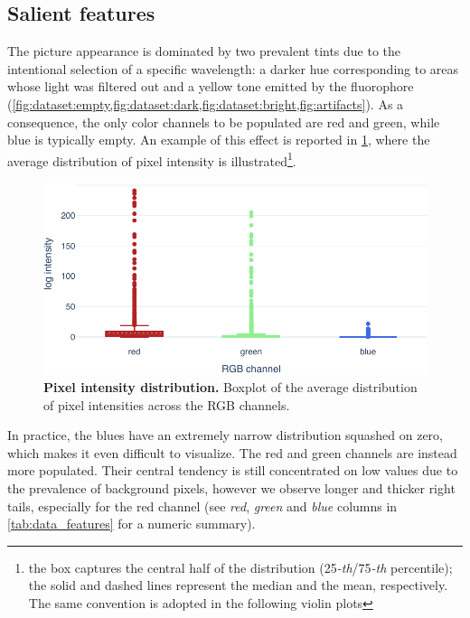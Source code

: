 \subsection{Salient features}
\label{sec:data_features}

The picture appearance is dominated by two prevalent tints due to the intentional selection of a specific wavelength: a darker hue corresponding to areas whose light was filtered out and a yellow tone emitted by the fluorophore
(\cref{fig:dataset:empty,fig:dataset:dark,fig:dataset:bright,fig:artifacts}).
As a consequence, the only color channels to be populated are red and green, while blue is typically empty. 
An example of this effect is reported in \cref{fig:dataset:pixel_intensity}, where the average distribution of pixel intensity is illustrated\footnote{the box captures the central half of the distribution (25\emph{-th}/75\emph{-th} percentile); the solid and dashed lines represent the median and the mean, respectively. The same convention is adopted in the following violin plots}.
\begin{figure}
    \centering
    \includegraphics[width=\textwidth]{figures/120_dataset/features/pixel_intensity_distribution.pdf}
    \caption{\textbf{Pixel intensity distribution.} Boxplot of the average distribution of pixel intensities across the  RGB channels.}
    \label{fig:dataset:pixel_intensity}
\end{figure}
In practice, the blues have an extremely narrow distribution squashed on zero, which makes it even difficult to visualize. %
The red and green channels are instead more populated. Their central tendency is still concentrated on low values due to the prevalence of background pixels, however we observe longer and thicker right tails, especially for the red channel (see \textit{red}, \textit{green} and \textit{blue} columns in \cref{tab:data_features} for a numeric summary).
